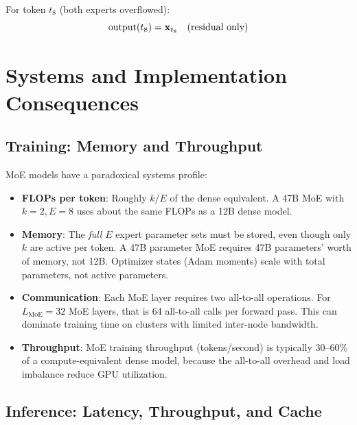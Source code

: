 For token $t_8$ (both experts overflowed):
\[
\text{output}(t_8) = \mathbf{x}_{t_8} \quad \text{(residual only)}
\]

\section{Systems and Implementation Consequences}
\label{ch:13:sec:systems}

\subsection{Training: Memory and Throughput}

MoE models have a paradoxical systems profile:
\begin{itemize}
  \item \textbf{FLOPs per token}: Roughly $k/E$ of the dense equivalent. A 47B MoE with $k=2, E=8$ uses about the same FLOPs as a 12B dense model.
  \item \textbf{Memory}: The \emph{full} $E$ expert parameter sets must be stored, even though only $k$ are active per token. A 47B parameter MoE requires 47B parameters' worth of memory, not 12B. Optimizer states (Adam moments) scale with total parameters, not active parameters.
  \item \textbf{Communication}: Each MoE layer requires two all-to-all operations. For $L_{\text{MoE}} = 32$ MoE layers, that is 64 all-to-all calls per forward pass. This can dominate training time on clusters with limited inter-node bandwidth.
  \item \textbf{Throughput}: MoE training throughput (tokens/second) is typically 30--60\% of a compute-equivalent dense model, because the all-to-all overhead and load imbalance reduce GPU utilization.
\end{itemize}

\subsection{Inference: Latency, Throughput, and Cache}

